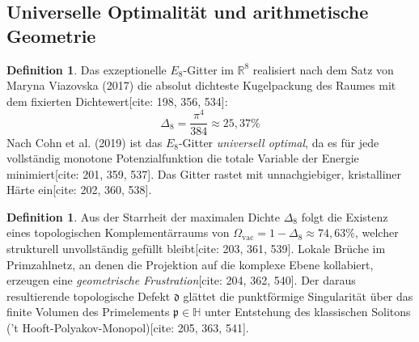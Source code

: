 \documentclass[11pt,a4paper]{article}
\newcommand{\R}{\mathbb{R}}
\newcommand{\Halg}{\mathbb{H}}
\newcommand{\Eoct}{E_8}
\theoremstyle{definition}
\newtheorem{definition}[theorem]{Definition}
\begin{document}
	\subsection{Universelle Optimalität und arithmetische Geometrie}
	\begin{definition}
		Das exzeptionelle $\Eoct$-Gitter im $\R^8$ realisiert nach dem Satz von Maryna Viazovska (2017) die absolut dichteste Kugelpackung des Raumes mit dem fixierten Dichtewert[cite: 198, 356, 534]:
		\begin{equation}
			\Delta_8 = \frac{\pi^4}{384} \approx 25{,}37\%
		\end{equation}
		Nach Cohn et al. (2019) ist das $\Eoct$-Gitter \textit{universell optimal}, da es für jede vollständig monotone Potenzialfunktion die totale Variable der Energie minimiert[cite: 201, 359, 537]. Das Gitter rastet mit unnachgiebiger, kristalliner Härte ein[cite: 202, 360, 538].
	\end{definition}
	
	\begin{definition}
		Aus der Starrheit der maximalen Dichte $\Delta_8$ folgt die Existenz eines topologischen Komplementärraums von $\Omega_{\text{vac}} = 1 - \Delta_8 \approx 74{,}63\%$, welcher strukturell unvollständig gefüllt bleibt[cite: 203, 361, 539]. Lokale Brüche im Primzahlnetz, an denen die Projektion auf die komplexe Ebene kollabiert, erzeugen eine \textit{geometrische Frustration}[cite: 204, 362, 540]. Der daraus resultierende topologische Defekt $\mathfrak{d}$ glättet die punktförmige Singularität über das finite Volumen des Primelements $\mathfrak{p} \in \Halg$ unter Entstehung des klassischen Solitons ('t Hooft-Polyakov-Monopol)[cite: 205, 363, 541].
	\end{definition}
	
\end{document}
